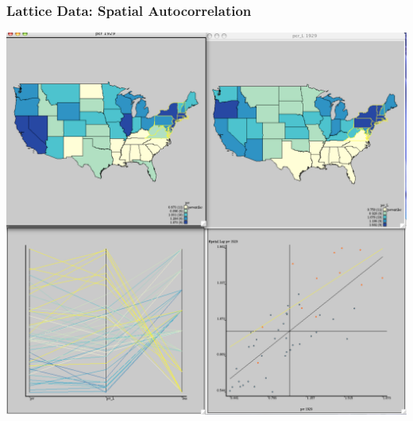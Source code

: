 \documentclass[nototal,handout]{beamer}
\begin{document}
\begin{frame}
    \frametitle{Lattice Data: Spatial Autocorrelation}
    \begin{center}
      \includegraphics[width=.65\linewidth]{lattice2}
    \end{center}
  \end{frame}
\end{document}
